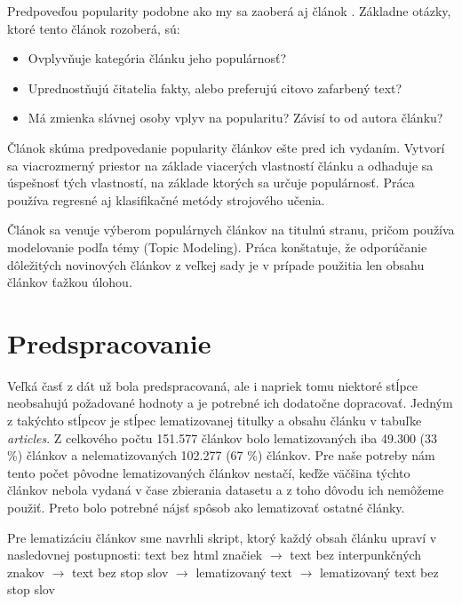 \documentclass[runningheads,a4paper]{llncs}
\begin{document}
Predpoveďou popularity podobne ako my sa zaoberá aj článok \cite{pulse}. Základne otázky, ktoré tento článok rozoberá, sú:
\begin{itemize}
\renewcommand{\labelitemi}{$\bullet$}
  \item Ovplyvňuje kategória článku jeho populárnosť?
  \item Uprednostňujú čitatelia fakty, alebo preferujú citovo zafarbený text?
  \item Má zmienka slávnej osoby vplyv na popularitu? Závisí to od autora článku?
\end{itemize}
Článok skúma predpovedanie popularity článkov ešte pred ich vydaním. Vytvorí sa viacrozmerný priestor na základe viacerých vlastností článku a odhaduje sa úspešnosť tých vlastností, na základe ktorých sa určuje populárnosť. Práca používa regresné aj klasifikačné metódy strojového učenia.

Článok \cite{topic} sa venuje výberom populárnych článkov na titulnú stranu, pričom používa modelovanie podľa témy (Topic Modeling).
Práca konštatuje, že odporúčanie dôležitých novinových článkov z veľkej sady je v prípade použitia len obsahu článkov ťažkou úlohou.

\section{Predspracovanie}
Veľká časť z dát už bola predspracovaná, ale i napriek tomu niektoré stĺpce neobsahujú požadované hodnoty a je potrebné ich dodatočne dopracovať.
Jedným z takýchto stĺpcov je stĺpec lematizovanej titulky a obsahu článku v tabuľke {\em articles}.
Z celkového počtu 151.577 článkov bolo lematizovaných iba 49.300 (33 \%) článkov a nelematizovaných 102.277 (67 \%) článkov.
Pre naše potreby nám tento počet pôvodne lematizovaných článkov nestačí, keďže väčšina týchto článkov nebola vydaná v čase zbierania datasetu a z toho dôvodu ich nemôžeme použiť.
Preto bolo potrebné nájsť spôsob ako lematizovať ostatné články.

Pre lematizáciu článkov sme navrhli skript, ktorý každý obsah článku upraví v nasledovnej postupnosti:
\newline
\newline
text bez html značiek $\rightarrow$ text bez interpunkčných znakov $\rightarrow$ text bez stop slov $\rightarrow$ lematizovaný text $\rightarrow$ lematizovaný text bez stop slov
\newline
\end{document}
